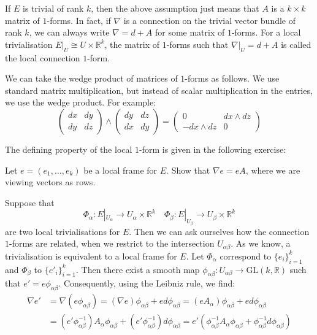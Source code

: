 If $E$ is trivial of rank $k$, then the above assumption just means that $A$ is a $k\times k$ matrix of $1$-forms. In fact, if $\nabla$ is a connection on the trivial vector bundle of rank $k$, we can always write $\nabla=d+A$ for some matrix of $1$-forms. For a local trivialisation $E|_U\cong U\times\mathbb{R}^k$, the matrix of $1$-forms such that $\nabla|_U=d+A$ is called the local connection $1$-form.
\begin{remark}
  We can take the wedge product of matrices of $1$-forms as follows. We use standard matrix multiplication, but instead of scalar multiplication in the entries, we use the wedge product. For example:
  $$\begin{pmatrix}dx & dy\\ dy & dz\end{pmatrix}\wedge\begin{pmatrix}dy & dz\\ dx & dy\end{pmatrix}=\begin{pmatrix}0 & dx\wedge dz\\ -dx\wedge dz & 0\end{pmatrix}$$
\end{remark}
The defining property of the local $1$-form is given in the following exercise:
\begin{exercise}\label{local}
  Let $e=(e_1,\dots,e_k)$ be a local frame for $E$. Show that $\nabla e=eA$, where we are viewing vectors as rows.
\end{exercise}
Suppose that
$$\Phi_\alpha:E|_{U_\alpha}\to U_\alpha\times\mathbb{R}^k\quad \Phi_\beta:E|_{U_\beta}\to U_\beta\times\mathbb{R}^k$$
are two local trivialisations for $E$. Then we can ask ourselves how the connection $1$-forms are related, when we restrict to the intersection $U_{\alpha\beta}$. As we know, a trivialisation is equivalent to a local frame for $E$. Let $\Phi_\alpha$ correspond to $\{e_i\}_{i=1}^k$ and $\Phi_\beta$ to $\{e'_i\}_{i=1}^k$. Then there exist a smooth map $\phi_{\alpha\beta}:U_{\alpha\beta}\to\text{GL}(k,\mathbb{R})$ such that $e'=e\phi_{\alpha\beta}$. Consequently, using the Leibniz rule, we find:
\begin{align*}
  \nabla e' &= \nabla (e\phi_{\alpha\beta})=(\nabla e)\phi_{\alpha\beta}+ed\phi_{\alpha\beta}=
  (eA_\alpha)\phi_{\alpha\beta}+ed\phi_{\alpha\beta} \\
            &= (e'\phi_{\alpha\beta}^{-1})A_\alpha\phi_{\alpha\beta}+(e'\phi_{\alpha\beta}^{-1})d\phi_{\alpha\beta}=e'(\phi_{\alpha\beta}^{-1}A_\alpha\phi_{\alpha\beta}+\phi_{\alpha\beta}^{-1}d\phi_{\alpha\beta})
\end{align*}

